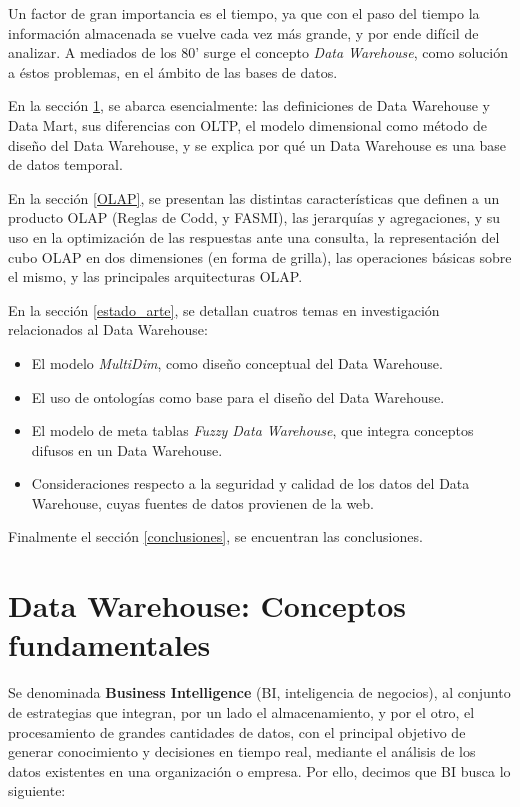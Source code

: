 \documentclass[a4paper,11pt]{article}
\begin{document}
    Un factor de gran importancia es el tiempo, ya que con el paso del tiempo la información almacenada se vuelve cada vez más grande,
    y por ende difícil de analizar. A mediados de los 80' surge el concepto \textit{Data Warehouse}, como solución a éstos problemas,
    en el ámbito de las bases de datos.
    
    En la sección \ref{conceptos_fundamentales}, se abarca esencialmente: las definiciones de Data Warehouse y Data Mart, sus diferencias con OLTP, el modelo dimensional como
    método de diseño del Data Warehouse, y se explica por qué un Data Warehouse es una base de datos temporal.
    
    En la sección \ref{OLAP}, se presentan las distintas características que definen a un producto OLAP (Reglas de Codd, y FASMI), las jerarquías y agregaciones, y
    su uso en la optimización de las respuestas ante una consulta, la representación del cubo OLAP en dos dimensiones (en forma de grilla), las operaciones
    básicas sobre el mismo, y las principales arquitecturas OLAP.
    
    En la sección \ref{estado_arte}, se detallan cuatros temas en investigación relacionados al Data Warehouse:
    \begin{itemize}
      \item El modelo \textit{MultiDim}, como diseño conceptual del Data Warehouse.
      \item El uso de ontologías como base para el diseño del Data Warehouse.
      \item El modelo de meta tablas \textit{Fuzzy Data Warehouse}, que integra conceptos difusos en un Data Warehouse.
      \item Consideraciones respecto a la seguridad y calidad de los datos del Data Warehouse, cuyas fuentes de datos provienen de la web.
    \end{itemize}
    
    Finalmente el sección \ref{conclusiones}, se encuentran las conclusiones.
    


    \section{Data Warehouse: Conceptos fundamentales} \label{conceptos_fundamentales}
    
    Se denominada \textbf{Business Intelligence} (BI, inteligencia de negocios), al conjunto de estrategias que integran, por un lado el almacenamiento, y
    por el otro, el procesamiento de grandes cantidades de datos, con el principal objetivo de generar conocimiento y decisiones en tiempo real, mediante 
    el análisis de los datos existentes en una organización o empresa. Por ello, decimos que BI busca lo siguiente:
    
\end{document}
